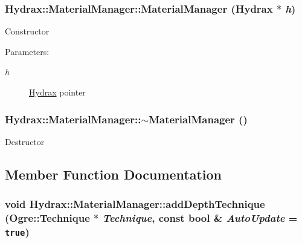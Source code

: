 \begin{CompactItemize}
{\subsubsection[{MaterialManager}]{\setlength{\rightskip}{0pt plus 5cm}Hydrax::MaterialManager::MaterialManager ({\bf Hydrax} $\ast$ {\em h})}}
\label{class_hydrax_1_1_material_manager_22ad71a4c9f71a65d45922788abdbab6}


Constructor \begin{Desc}
\item[Parameters:]
\begin{description}
\item[{\em h}]\hyperlink{class_hydrax_1_1_hydrax}{Hydrax} pointer \end{description}
\end{Desc}
\hypertarget{class_hydrax_1_1_material_manager_071d2479a52e9d36ff25bbab8c09e728}{
\subsubsection[{$\sim$MaterialManager}]{\setlength{\rightskip}{0pt plus 5cm}Hydrax::MaterialManager::$\sim$MaterialManager ()}}
\label{class_hydrax_1_1_material_manager_071d2479a52e9d36ff25bbab8c09e728}


Destructor 

\subsection{Member Function Documentation}
\hypertarget{class_hydrax_1_1_material_manager_b70527e20f62a739a738773173c7966f}{
\subsubsection[{addDepthTechnique}]{\setlength{\rightskip}{0pt plus 5cm}void Hydrax::MaterialManager::addDepthTechnique (Ogre::Technique $\ast$ {\em Technique}, \/  const bool \& {\em AutoUpdate} = {\tt true})}}
\label{class_hydrax_1_1_material_manager_b70527e20f62a739a738773173c7966f}



\end{CompactItemize}
